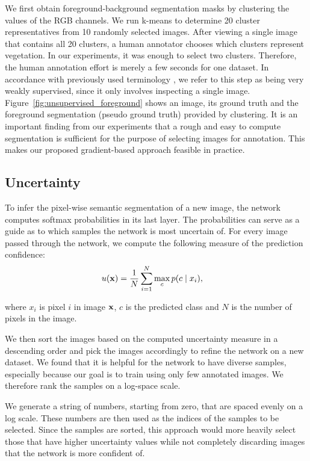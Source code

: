 \documentclass[letterpaper, 10 pt, conference]{ieeeconf}  %
\begin{document}
We first obtain foreground-background segmentation masks by clustering the values of the RGB channels. We run k-means to determine 20 cluster representatives from 10 randomly selected images. After viewing a single image that contains all 20 clusters, a human annotator chooses which clusters represent vegetation. In our experiments, it was enough to select two clusters. Therefore, the human annotation effort is merely a few seconds for one dataset. In accordance with previously used terminology \cite{zhang2018self}, we refer to this step as being very weakly supervised, since it only involves inspecting a single image. Figure~\ref{fig:unsupervised_foreground} shows an image, its ground truth and the foreground segmentation (pseudo ground truth) provided by clustering. It is an important finding from our experiments that a rough and easy to compute segmentation is sufficient for the purpose of selecting images for annotation. This makes our proposed gradient-based approach feasible in practice.


\subsection{Uncertainty}

To infer the pixel-wise semantic segmentation of a new image, the network computes softmax probabilities in its last layer. The probabilities can serve as a guide as to which samples the network is most uncertain of. For every image passed through the network, we compute the following measure of the prediction confidence:
\begin{align}
u(\bold{x}) &= \frac{1}{N} \sum_{i=1}^N \max_c p(c  \mid  x_i),
\end{align}  

where $x_i$ is pixel $i$ in image $\bold{x}$, $c$ is the predicted class and $N$ is the number of pixels in the image.

We then sort the images based on the computed uncertainty measure in a descending order and pick the images accordingly to refine the network on a new dataset. We found that it is helpful for the network to have diverse samples, especially because our goal is to train using only few annotated images. We therefore rank the samples on a log-space scale.

We generate a string of numbers, starting from zero, that are spaced evenly on a log scale. These numbers are then used as the indices of the samples to be selected. Since the samples are sorted, this approach would more heavily select those that have higher uncertainty values while not completely discarding images that the network is more confident of.
\end{document}
